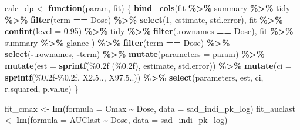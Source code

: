 \documentclass[
  12pt,
]{krantz}
\newenvironment{Shaded}{\begin{snugshade}}{\end{snugshade}}
\newcommand{\ControlFlowTok}[1]{\textcolor[rgb]{0.13,0.29,0.53}{\textbf{#1}}}
\newcommand{\DataTypeTok}[1]{\textcolor[rgb]{0.13,0.29,0.53}{#1}}
\newcommand{\DecValTok}[1]{\textcolor[rgb]{0.00,0.00,0.81}{#1}}
\newcommand{\FloatTok}[1]{\textcolor[rgb]{0.00,0.00,0.81}{#1}}
\newcommand{\KeywordTok}[1]{\textcolor[rgb]{0.13,0.29,0.53}{\textbf{#1}}}
\newcommand{\NormalTok}[1]{#1}
\newcommand{\OperatorTok}[1]{\textcolor[rgb]{0.81,0.36,0.00}{\textbf{#1}}}
\newcommand{\StringTok}[1]{\textcolor[rgb]{0.31,0.60,0.02}{#1}}
\begin{document}
\begin{Shaded}
\begin{Highlighting}[]
\NormalTok{calc\_dp \textless{}{-}}\StringTok{ }\ControlFlowTok{function}\NormalTok{(param, fit) \{}
  \KeywordTok{bind\_cols}\NormalTok{(fit }\OperatorTok{\%\textgreater{}\%}\StringTok{ }\NormalTok{summary }\OperatorTok{\%\textgreater{}\%}\StringTok{ }\NormalTok{tidy }\OperatorTok{\%\textgreater{}\%}\StringTok{ }\KeywordTok{filter}\NormalTok{(term }\OperatorTok{==}\StringTok{ \textquotesingle{}Dose\textquotesingle{}}\NormalTok{) }\OperatorTok{\%\textgreater{}\%}\StringTok{ }\KeywordTok{select}\NormalTok{(}\DecValTok{1}\NormalTok{, }\StringTok{\textquotesingle{}estimate\textquotesingle{}}\NormalTok{, }\StringTok{\textquotesingle{}std.error\textquotesingle{}}\NormalTok{), }
\NormalTok{            fit }\OperatorTok{\%\textgreater{}\%}\StringTok{ }\KeywordTok{confint}\NormalTok{(}\DataTypeTok{level =} \FloatTok{0.95}\NormalTok{) }\OperatorTok{\%\textgreater{}\%}\StringTok{ }\NormalTok{tidy }\OperatorTok{\%\textgreater{}\%}\StringTok{ }\KeywordTok{filter}\NormalTok{(.rownames }\OperatorTok{==}\StringTok{ \textquotesingle{}Dose\textquotesingle{}}\NormalTok{), }
\NormalTok{            fit }\OperatorTok{\%\textgreater{}\%}\StringTok{ }\NormalTok{summary }\OperatorTok{\%\textgreater{}\%}\StringTok{ }\NormalTok{glance}
\NormalTok{            ) }\OperatorTok{\%\textgreater{}\%}\StringTok{ }
\StringTok{    }\KeywordTok{filter}\NormalTok{(term }\OperatorTok{==}\StringTok{ \textquotesingle{}Dose\textquotesingle{}}\NormalTok{) }\OperatorTok{\%\textgreater{}\%}\StringTok{ }
\StringTok{    }\KeywordTok{select}\NormalTok{(}\OperatorTok{{-}}\NormalTok{.rownames, }\OperatorTok{{-}}\NormalTok{term) }\OperatorTok{\%\textgreater{}\%}\StringTok{ }
\StringTok{    }\KeywordTok{mutate}\NormalTok{(}\DataTypeTok{parameters =}\NormalTok{ param) }\OperatorTok{\%\textgreater{}\%}\StringTok{ }
\StringTok{    }\KeywordTok{mutate}\NormalTok{(}\DataTypeTok{est =} \KeywordTok{sprintf}\NormalTok{(}\StringTok{\textquotesingle{}\%0.2f (\%0.2f)\textquotesingle{}}\NormalTok{, estimate, std.error)) }\OperatorTok{\%\textgreater{}\%}\StringTok{ }
\StringTok{    }\KeywordTok{mutate}\NormalTok{(}\DataTypeTok{ci =} \KeywordTok{sprintf}\NormalTok{(}\StringTok{\textquotesingle{}\%0.2f{-}\%0.2f\textquotesingle{}}\NormalTok{, X2.}\DecValTok{5}\NormalTok{.., X97.}\DecValTok{5}\NormalTok{..)) }\OperatorTok{\%\textgreater{}\%}\StringTok{ }
\StringTok{    }\KeywordTok{select}\NormalTok{(parameters, est, ci, r.squared, p.value)}
\NormalTok{\}}

\NormalTok{fit\_cmax \textless{}{-}}\StringTok{ }\KeywordTok{lm}\NormalTok{(}\DataTypeTok{formula =}\NormalTok{ Cmax }\OperatorTok{\textasciitilde{}}\StringTok{ }\NormalTok{Dose, }\DataTypeTok{data =}\NormalTok{ sad\_indi\_pk\_log)}
\NormalTok{fit\_auclast \textless{}{-}}\StringTok{ }\KeywordTok{lm}\NormalTok{(}\DataTypeTok{formula =}\NormalTok{ AUClast }\OperatorTok{\textasciitilde{}}\StringTok{ }\NormalTok{Dose, }\DataTypeTok{data =}\NormalTok{ sad\_indi\_pk\_log)}


\end{Highlighting}
\end{Shaded}
\end{document}
